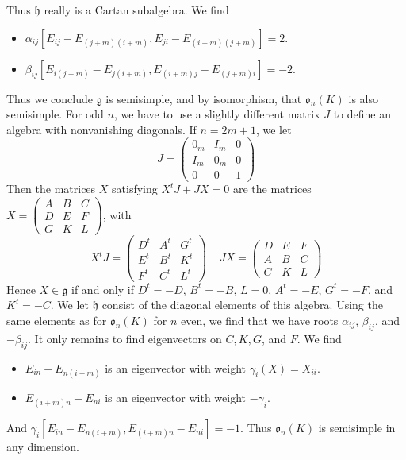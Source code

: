 \begin{example}
\begin{itemize}
    \end{itemize}
    Thus $\mathfrak{h}$ really is a Cartan subalgebra. We find
    \begin{itemize}
        \item $\alpha_{ij}[E_{ij} - E_{(j+m)(i+m)}, E_{ji} - E_{(i+m)(j+m)}] = 2$.
        \item $\beta_{ij}[E_{i(j+m)} - E_{j(i+m)}, E_{(i+m)j} - E_{(j+m)i}] = -2$.
    \end{itemize}
    Thus we conclude $\mathfrak{g}$ is semisimple, and by isomorphism, that $\mathfrak{o}_n(K)$ is also semisimple. For odd $n$, we have to use a slightly different matrix $J$ to define an algebra with nonvanishing diagonals. If $n = 2m + 1$, we let
    \[ J = \begin{pmatrix} 0_m & I_m & 0 \\ I_m & 0_m & 0 \\ 0 & 0 & 1 \end{pmatrix} \]
    Then the matrices $X$ satisfying $X^tJ + JX = 0$ are the matrices $X = \left( \begin{smallmatrix} A & B & C \\ D & E & F \\ G & K & L \end{smallmatrix} \right)$, with
    \[ X^tJ = \begin{pmatrix} D^t & A^t & G^t \\ E^t & B^t & K^t \\ F^t & C^t & L^t \end{pmatrix}\ \ \ \ \ JX = \begin{pmatrix} D & E & F \\ A & B & C \\ G & K & L \end{pmatrix} \]
    Hence $X \in \mathfrak{g}$ if and only if $D^t = -D$, $B^t = -B$, $L = 0$, $A^t = -E$, $G^t = -F$, and $K^t = -C$. We let $\mathfrak{h}$ consist of the diagonal elements of this algebra. Using the same elements as for $\mathfrak{o}_n(K)$ for $n$ even, we find that we have roots $\alpha_{ij}$, $\beta_{ij}$, and $-\beta_{ij}$. It only remains to find eigenvectors on $C,K,G$, and $F$. We find
    \begin{itemize}
        \item $E_{in} - E_{n(i + m)}$ is an eigenvector with weight $\gamma_i(X) = X_{ii}$.
        \item $E_{(i + m)n} - E_{ni}$ is an eigenvector with weight $-\gamma_i$.
    \end{itemize}
    And $\gamma_i[E_{in} - E_{n(i+m)}, E_{(i+m)n} - E_{ni}] = -1$. Thus $\mathfrak{o}_n(K)$ is semisimple in any dimension.
\end{example}

